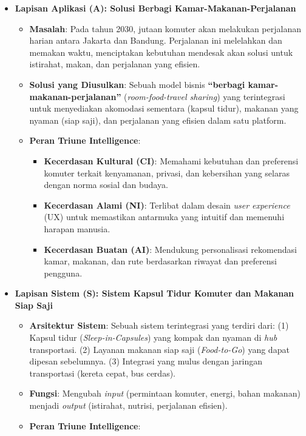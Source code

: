 \documentclass[
  letterpaper,
  DIV=11,
  numbers=noendperiod]{scrreprt}
\providecommand{\tightlist}{%
  \setlength{\itemsep}{0pt}\setlength{\parskip}{0pt}}
\begin{document}
\begin{itemize}
\tightlist
\item
  \textbf{Lapisan Aplikasi (A): Solusi Berbagi Kamar-Makanan-Perjalanan}

  \begin{itemize}
  \tightlist
  \item
    \textbf{Masalah}: Pada tahun 2030, jutaan komuter akan melakukan
    perjalanan harian antara Jakarta dan Bandung. Perjalanan ini
    melelahkan dan memakan waktu, menciptakan kebutuhan mendesak akan
    solusi untuk istirahat, makan, dan perjalanan yang efisien.
  \item
    \textbf{Solusi yang Diusulkan}: Sebuah model bisnis
    \textbf{``berbagi kamar-makanan-perjalanan''}
    (\emph{room-food-travel sharing}) yang terintegrasi untuk
    menyediakan akomodasi sementara (kapsul tidur), makanan yang nyaman
    (siap saji), dan perjalanan yang efisien dalam satu platform.
  \item
    \textbf{Peran Triune Intelligence}:

    \begin{itemize}
    \tightlist
    \item
      \textbf{Kecerdasan Kultural (CI)}: Memahami kebutuhan dan
      preferensi komuter terkait kenyamanan, privasi, dan kebersihan
      yang selaras dengan norma sosial dan budaya.
    \item
      \textbf{Kecerdasan Alami (NI)}: Terlibat dalam desain \emph{user
      experience} (UX) untuk memastikan antarmuka yang intuitif dan
      memenuhi harapan manusia.
    \item
      \textbf{Kecerdasan Buatan (AI)}: Mendukung personalisasi
      rekomendasi kamar, makanan, dan rute berdasarkan riwayat dan
      preferensi pengguna.
    \end{itemize}
  \end{itemize}
\item
  \textbf{Lapisan Sistem (S): Sistem Kapsul Tidur Komuter dan Makanan
  Siap Saji}

  \begin{itemize}
  \tightlist
  \item
    \textbf{Arsitektur Sistem}: Sebuah sistem terintegrasi yang terdiri
    dari: (1) Kapsul tidur (\emph{Sleep-in-Capsules}) yang kompak dan
    nyaman di \emph{hub} transportasi. (2) Layanan makanan siap saji
    (\emph{Food-to-Go}) yang dapat dipesan sebelumnya. (3) Integrasi
    yang mulus dengan jaringan transportasi (kereta cepat, bus cerdas).
  \item
    \textbf{Fungsi}: Mengubah \emph{input} (permintaan komuter, energi,
    bahan makanan) menjadi \emph{output} (istirahat, nutrisi, perjalanan
    efisien).
  \item
    \textbf{Peran Triune Intelligence}:


\end{itemize}
\end{itemize}
\end{document}

